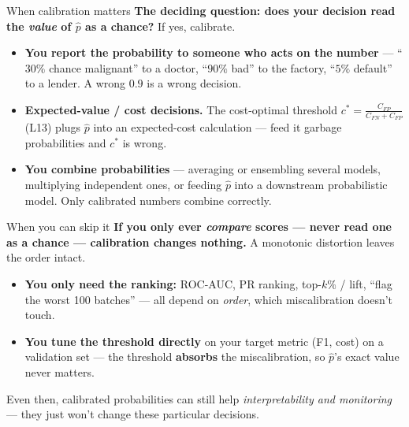 \documentclass[aspectratio=169]{beamer}
\begin{document}
\begin{frame}{When calibration matters}
  \textbf{The deciding question: does your decision read the \emph{value} of $\hat p$ as a chance?}
  If yes, calibrate.
  \vfill
  \begin{itemize}\small
    \item \textbf{You report the probability to someone who acts on the number} --- ``$30\%$ chance
      malignant'' to a doctor, ``$90\%$ bad'' to the factory, ``$5\%$ default'' to a lender. A
      wrong $0.9$ is a wrong decision.
    \item \textbf{Expected-value / cost decisions.} The cost-optimal threshold
      $c^* = \frac{C_{FP}}{C_{FN}+C_{FP}}$ (L13) plugs $\hat p$ into an expected-cost calculation
      --- feed it garbage probabilities and $c^*$ is wrong.
    \item \textbf{You combine probabilities} --- averaging or ensembling several models, multiplying
      independent ones, or feeding $\hat p$ into a downstream probabilistic model. Only calibrated
      numbers combine correctly.
  \end{itemize}
  \vfill
\end{frame}

\begin{frame}{When you can skip it}
  \textbf{If you only ever \emph{compare} scores --- never read one as a chance --- calibration
  changes nothing.} A monotonic distortion leaves the order intact.
  \vfill
  \begin{itemize}\small
    \item \textbf{You only need the ranking:} ROC-AUC, PR ranking, top-$k\%$ / lift, ``flag the
      worst 100 batches'' --- all depend on \emph{order}, which miscalibration doesn't touch.
    \item \textbf{You tune the threshold directly} on your target metric (F1, cost) on a validation
      set --- the threshold \textbf{absorbs} the miscalibration, so $\hat p$'s exact value never
      matters.
  \end{itemize}
  \vskip 2pt
  \footnotesize Even then, calibrated probabilities can still help \emph{interpretability and
  monitoring} --- they just won't change these particular decisions.
  \vfill
\end{frame}
\end{document}
